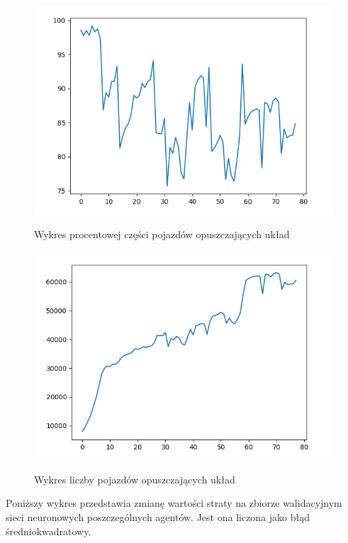 \documentclass[12pt]{book}
\theoremstyle{plain}
\begin{document}
\begin{figure}[H]
	\centering
	\includegraphics[width=13.5cm]{images/poli_wyniki/plot_cars_out_percentage_no_title}
	\label{fig:env_poli_out_percentage}
	\caption{Wykres procentowej części pojazdów opuszczających układ}
	\centering
\end{figure}
\begin{figure}[H]
	\centering
	\includegraphics[width=13.5cm]{images/poli_wyniki/plot_cars_out_no_title}
	\label{fig:env_poli_out}
		\caption{Wykres liczby pojazdów opuszczających układ}
	\centering
\end{figure} \newpage
\noindent Poniższy wykres przedstawia zmianę wartości straty na zbiorze walidacyjnym sieci neuronowych poszczególnych agentów. Jest ona liczona jako błąd średniokwadratowy.
\end{document}
